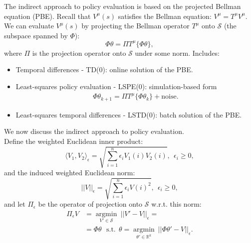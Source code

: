 The indirect approach to policy evaluation is based on the projected Bellman equation (PBE). Recall that $V^\mu(s)$ satisfies the Bellman equation: $V^\mu = T^\mu V^\mu$. We can evaluate $V^\mu(s)$ by projecting the Bellman operator $T^\mu$ onto $\mathcal{S}$ (the subspace spanned by $\Phi$):
\begin{equation*}
    \Phi \theta = \Pi T^\mu \{\Phi \theta\},
\end{equation*}
where $\Pi$ is the projection operator onto $\mathcal{S}$ under some norm.
Includes:
\begin{itemize}
\item Temporal differences - TD(0): online solution of the PBE.
\item Least-squares policy evaluation - LSPE(0): simulation-based form
\begin{align*}\Phi \theta_{k+1} = \Pi T^\mu \{\Phi \theta_k\} + \mathrm{noise}.\end{align*} 
\item Least-squares temporal differences - LSTD(0): batch solution of the PBE.
\end{itemize}

We now discuss the indirect approach to policy evaluation.
\\
Define the weighted Euclidean inner product:
$$\langle V_1,V_2\rangle_\epsilon = \sqrt{\sum_{i=1}^n \epsilon_i V_1(i)V_2(i)}, \ \ \epsilon_i\ge0,$$
and the induced weighted Euclidean norm:
$$||V||_\epsilon = \sqrt{\sum_{i=1}^n \epsilon_i V(i)^2}, \ \ \epsilon_i\ge0,$$
and let $\Pi_\epsilon$ be the operator of projection onto $\mathcal{S}$ w.r.t. this norm:
\begin{align*}\Pi_\epsilon V &=\underset{V' \in \mathcal{S}}{\operatorname{argmin}} \ ||V'-V||_\epsilon =\\
&= \Phi \theta \ \ \ \mathrm{s.t.} \ \ \theta = \underset{\theta' \in \mathbb{R}^k}{\operatorname{argmin}} \ ||\Phi \theta' - V||_\epsilon.\end{align*}

